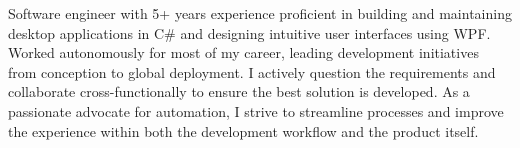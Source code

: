 \begin{justify}
Software engineer with 5+ years experience proficient in building and maintaining desktop applications in C\# and designing intuitive user interfaces using WPF. Worked autonomously for most of my career, leading development initiatives from conception to global deployment. I actively question the requirements and collaborate cross-functionally to ensure the best solution is developed. As a passionate advocate for automation, I strive to streamline processes and improve the experience within both the development workflow and the product itself.
\end{justify}